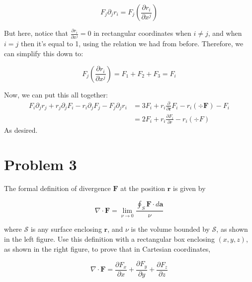 \documentclass[10pt]{article}
\begin{document}
\begin{enumerate}[(a)]
\begin{solution}
                \[ F_j \partial_j r_i = F_j \left( \frac{\partial r_i}{\partial x^j}\right)\]

                But here, notice that $\frac{\partial r_i}{\partial x^j} = 0$ in rectangular coordinates when $i \neq j$, and when $i = j$ then it's equal to 1, using the relation we had from before. Therefore, we can simplify this down to:

                \[ F_j \left( \frac{\partial r_i}{\partial x^j}\right) = F_1 + F_2 + F_3 = F_i\] 

                Now, we can put this all together: 
                \begin{align*}
                    F_i\partial_jr_j + r_j\partial_jF_i-r_i\partial_jF_j-F_j\partial_jr_i &= 3F_i + r_i\frac{\partial}{\partial \mathbf{r}}F_i - r_i(\div\mathbf{F}) - F_i \\
                    &= 2F_i + r_i \frac{\partial F_i}{\partial r} - r_i (\div F)
                \end{align*}
                As desired.
        \end{solution}
    \end{enumerate}

    \pagebreak

    \section*{Problem 3}

    The formal definition of divergence $\mathbf F$ at the position $\mathbf r$ is given by 

    \[ \nabla \cdot \mathbf F = \lim_{\mathcal \nu \to 0} \frac{\oint_S \mathbf F \cdot d\mathbf a}{\mathcal \nu}\] 

    where $\mathcal S$ is any surface enclosing $\mathbf r$, and $\mathcal \nu$ is the volume bounded by $\mathcal S$, as shown in the left figure. Use this definition with a rectangular box enclosing $(x, y, z)$, as shown in the right figure, to prove that in Cartesian coordinates, 

    \[ \nabla \cdot \mathbf F = \frac{\partial F_x}{\partial x} + \frac{\partial F_y}{\partial y} + \frac{\partial F_z}{\partial z}\] 
\end{document}
